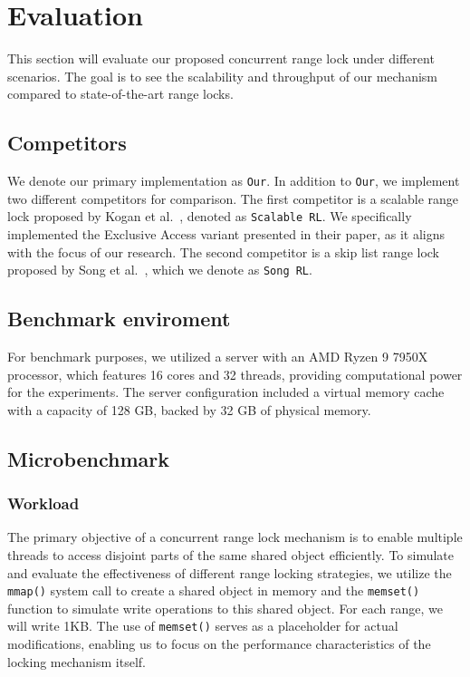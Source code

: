 \chapter{Evaluation}\label{chapter:evaluation}

This section will evaluate our proposed concurrent range lock under different scenarios. 
The goal is to see the scalability and throughput of our mechanism compared to state-of-the-art range locks.

\section{Competitors}

We denote our primary implementation as \texttt{Our}. 
In addition to \texttt{Our}, we implement two different competitors for comparison. 
The first competitor is a scalable range lock proposed by Kogan et al.~\parencite{kogan2020scalable}, denoted as \texttt{Scalable RL}. 
We specifically implemented the Exclusive Access variant presented in their paper, as it aligns with the focus of our research. 
The second competitor is a skip list range lock proposed by Song et al.~\parencite{song2013parallelizing}, which we denote as \texttt{Song RL}.

\section{Benchmark enviroment}

For benchmark purposes, we utilized a server with an AMD Ryzen 9 7950X processor, which features 16 cores and 32 threads, providing computational power for the experiments. 
The server configuration included a virtual memory cache with a capacity of 128 GB, backed by 32 GB of physical memory. 

\section{Microbenchmark}\label{sec:microbenchmark}

\subsection{Workload}\label{subsec:workload}
The primary objective of a concurrent range lock mechanism is to enable multiple threads to access disjoint parts of the same shared object efficiently. 
To simulate and evaluate the effectiveness of different range locking strategies, we utilize the \texttt{mmap()} system call to create a shared object in memory and the \texttt{memset()} function to simulate write operations to this shared object. 
For each range, we will write 1KB. 
The use of \texttt{memset()} serves as a placeholder for actual modifications, enabling us to focus on the performance characteristics of the locking mechanism itself.

